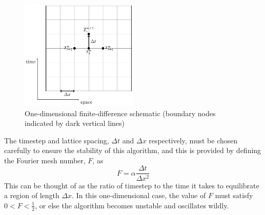 \begin{figure}[h]
	\centering
	\includegraphics[width=0.5\textwidth]{finitediff}
	\caption{One-dimensional finite-difference schematic (boundary nodes indicated by dark vertical lines)}
	\label{fig:1DFD}
\end{figure}

The timestep and lattice spacing, $\Delta t$
and $\Delta x$ respectively, must be chosen carefully to ensure the
stability of this algorithm, and this is provided by defining the Fourier
mesh number, $F$, as
\begin{equation}
F = \alpha \frac{\Delta t}{\Delta x^2}
\end{equation}
This can be thought of as the ratio of timestep to the time it takes to
equilibrate a region of length $\Delta x$. In this one-dimensional
case, the value of $F$ must satisfy $0 < F < \frac{1}{2}$, or else
the algorithm becomes unstable and oscillates wildly.

